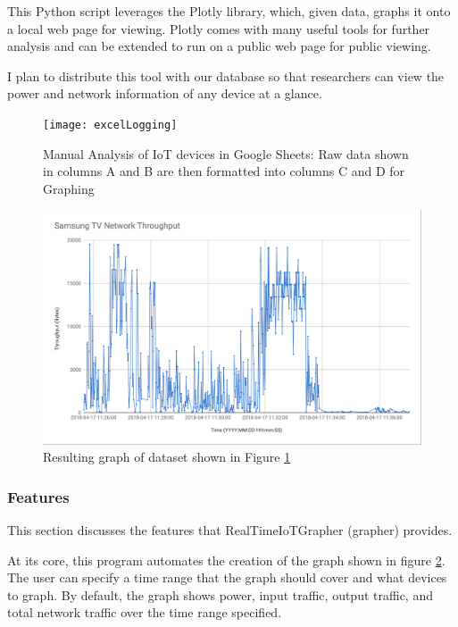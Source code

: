 This Python script leverages the Plotly \cite{plotly} library, which, given data, graphs it onto a local web page for viewing. Plotly comes with many useful tools for further analysis and can be extended to run on a public web page for public viewing.

I plan to distribute this tool with our database so that researchers can view the power and network information of any device at a glance.

\begin{figure}[H]
    \centering
    \texttt{[image: excelLogging]}
    \caption{Manual Analysis of IoT devices in Google Sheets: Raw data shown in columns A and B are then formatted into columns C and D for Graphing}
    \label{fig:excelLogging}
\end{figure}

\begin{figure}[H]
    \centering
    \includegraphics[width=1\textwidth]{figures/tvThroughput.png}
    \caption{Resulting graph of dataset shown in Figure \ref{fig:excelLogging}}
    \label{fig:tvThroughput}
\end{figure}

\subsubsection{Features}
\label{Features}

This section discusses the features that RealTimeIoTGrapher (grapher) provides.

At its core, this program automates the creation of the graph shown in figure \ref{fig:tvThroughput}. The user can specify a time range that the graph should cover and what devices to graph. By default, the graph shows power, input traffic, output traffic, and total network traffic over the time range specified.

